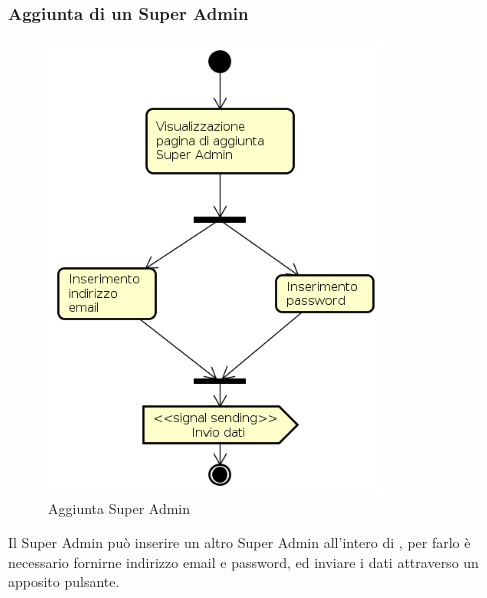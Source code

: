 \subsubsection{Aggiunta di un Super Admin}
\begin{figure}[H]
\begin{center}
\includegraphics[height=12cm]{res/sections/backend/activities/aggiuntaSuperAdmin.png}
\caption{Aggiunta Super Admin}
\end{center}
\end{figure}
Il Super Admin può inserire un altro Super Admin all'intero di , per farlo è necessario fornirne indirizzo email e password, ed inviare i dati attraverso un apposito pulsante.
